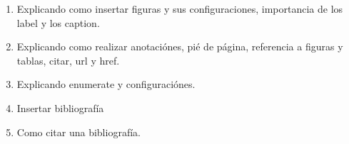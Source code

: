 \documentclass[12pt,letterpaper]{article}
\begin{document}
\begin{enumerate}
    \item Explicando como insertar figuras y sus configuraciones, importancia de los label y los caption.
    
    \item Explicando como realizar anotaciónes, pié de página, referencia a figuras y tablas, citar, url y href.
    
    \item Explicando enumerate y configuraciónes.
    
    \item Insertar bibliografía
    
    \item Como citar una bibliografía.
\end{enumerate}
\end{document}
